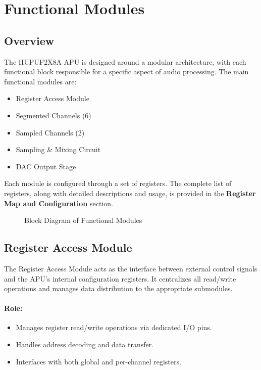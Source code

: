 \section{Functional Modules}

\subsection{Overview}
The HUPUF2X8A APU is designed around a modular architecture, with each functional block responsible for a specific aspect of audio processing. The main functional modules are:
\begin{itemize}
    \item Register Access Module
    \item Segmented Channels (6)
    \item Sampled Channels (2)
    \item Sampling \& Mixing Circuit
    \item DAC Output Stage
\end{itemize}

Each module is configured through a set of registers. The complete list of registers, along with detailed descriptions and usage, is provided in the \textbf{Register Map and Configuration} section.

\begin{figure}[h!]
    \centering
    \caption{Block Diagram of Functional Modules}
\end{figure}

\subsection{Register Access Module}
The Register Access Module acts as the interface between external control signals and the APU’s internal configuration registers. It centralizes all read/write operations and manages data distribution to the appropriate submodules.

\paragraph{Role:}
\begin{itemize}
    \item Manages register read/write operations via dedicated I/O pins.
    \item Handles address decoding and data transfer.
    \item Interfaces with both global and per-channel registers.
\end{itemize}

